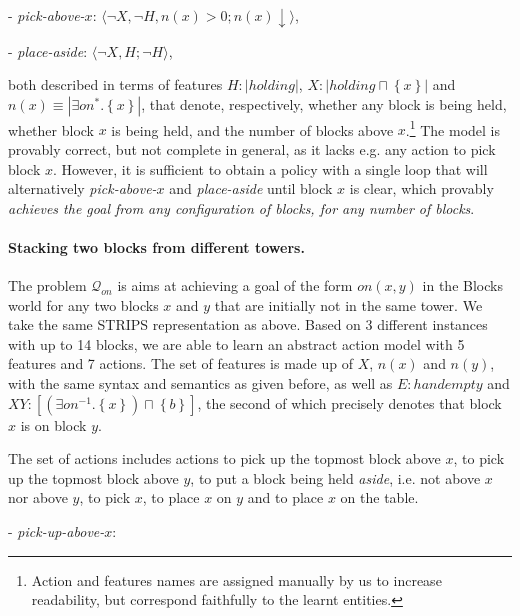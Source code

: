 \documentclass[letterpaper]{article} %
\newcommand{\tuple}[1]{\ensuremath{\langle #1 \rangle}}
\newcommand{\set}[1]{\ensuremath{\left\{#1 \right\}}}
\newcommand{\abs}[1]{\ensuremath{\left\vert{#1}\right\vert}}
\newcommand{\Q}{\mathcal{Q}}
\begin{document}
- \emph{pick-above-$x$}: \tuple{\neg X, \neg H, n(x) > 0; n(x) \downarrow},

- \emph{place-aside}: \tuple{\neg X, H; \neg H},

\noindent both described in terms of features $H: \abs{holding}$, $X: \abs{holding \sqcap \set{x}}$ and $n(x)\equiv \abs{\exists on^* . \set{x}}$, 
that denote, respectively, whether any block is being held, whether block $x$ is being held,
and the number of blocks above $x$.\footnote{
Action and features names are assigned manually by us to increase readability, but correspond faithfully
to the learnt entities.
}
%
The model is provably correct, but not complete in general, as it lacks e.g.
any action to pick block $x$.
However, it is sufficient to obtain a policy with a single loop that will 
alternatively \emph{pick-above-$x$} and \emph{place-aside} until block $x$ is clear,
which provably \emph{achieves the goal from any configuration of blocks, for any number of blocks}.

% 

% 

\paragraph{Stacking two blocks from different towers.}
The problem $\Q_{on}$ is aims at achieving a goal of the form $on(x,y)$
in the Blocks world for any two blocks $x$ and $y$ that are initially not in the same tower.
We take the same STRIPS representation as above. Based on 3 different instances with up to 14
blocks, we are able to learn an abstract action model with 5 features and 7 actions.
The set of features is made up of  $X$, $n(x)$ and $n(y)$, with the same syntax and semantics as given before,
as well as $E: handempty$
and $XY: [(\exists on^{-1} . \set{x})\sqcap \set{b}]$,
the second of which precisely denotes that block $x$ is on block $y$.

The set of actions includes actions to pick up the topmost block above $x$, to pick up the topmost block above $y$,
to put a block being held \emph{aside}, i.e. not above $x$ nor above $y$, to pick $x$, 
to place $x$ on $y$ and to place $x$ on the table. 

- \emph{pick-up-above-$x$}: 
\end{document}
